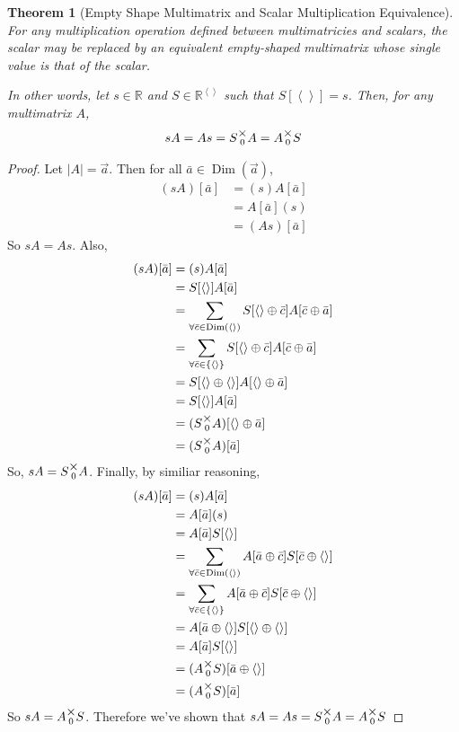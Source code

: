 \documentclass[12pt]{book}
\theoremstyle{plain}
\newtheorem{theorem}{Theorem}[chapter]
\theoremstyle{definition}
\theoremstyle{ppart}
\theoremstyle{case}
\theoremstyle{solution}
\DeclareMathOperator{\Dim}{Dim}
\newcommand{\mmult}[1]{\text{\raisebox{1ex}{$\underset{#1}{\times}$}}}
\begin{document}
\begin{theorem}[Empty Shape Multimatrix and Scalar Multiplication Equivalence]
\label{s_mm_mult_equiv}
For any multiplication operation defined between multimatricies and scalars,
the scalar may be replaced by an equivalent empty-shaped multimatrix whose
single value is that of the scalar.

In other words, let $s \in \mathbb{R}$ and $S \in \mathbb{R}^{\left<\right>}$ such that
$S[\left<\right>] = s$. Then, for any multimatrix $A$, 
\[ sA = As = S \mmult{0} A = A \mmult{0} S \]
\end{theorem}
\begin{proof}
Let $|A| = \vec{a}$. Then for all $\bar{a} \in \Dim(\vec{a})$,
\begin{align*}
	(sA)[\bar{a}]
	&= (s)A[\bar{a}] \\
	&= A[\bar{a}](s) \\
	&= (As)[\bar{a}]
\end{align*}
So $sA = As$. Also,
\begin{align*}
	(sA)[\bar{a}]
	&= (s)A[\bar{a}] \\
	&= S[\left<\right>]A[\bar{a}] \\
	&= \sum_{\forall \bar{c} \in \Dim(\left<\right>)}
		S[\left<\right> \oplus \bar{c}]A[\bar{c} \oplus \bar{a}] \\
	&= \sum_{\forall \bar{c} \in \{\left<\right>\}}
		S[\left<\right> \oplus \bar{c}]A[\bar{c} \oplus \bar{a}] \\
	&= S[\left<\right> \oplus \left<\right>]A[\left<\right> \oplus \bar{a}] \\
	&= S[\left<\right>]A[\bar{a}] \\
	&= (S \mmult{0} A)[\left<\right> \oplus \bar{a}] \\
	&= (S \mmult{0} A)[\bar{a}] \\
\end{align*}
So, $sA = S \mmult{0} A$.
Finally, by similiar reasoning,
\begin{align*}
	(sA)[\bar{a}]
	&= (s)A[\bar{a}] \\
	&= A[\bar{a}](s) \\
	&= A[\bar{a}]S[\left<\right>] \\
	&= \sum_{\forall \bar{c} \in \Dim(\left<\right>)}
		A[\bar{a} \oplus \bar{c}] S[\bar{c} \oplus \left<\right>] \\
	&= \sum_{\forall \bar{c} \in \{\left<\right>\}}
		A[\bar{a} \oplus \bar{c}] S[\bar{c} \oplus \left<\right>] \\
	&= A[\bar{a} \oplus \left<\right>] S[\left<\right> \oplus \left<\right>] \\
	&= A[\bar{a}]S[\left<\right>] \\
	&= (A \mmult{0} S)[\bar{a} \oplus \left<\right>] \\
	&= (A \mmult{0} S)[\bar{a}]
\end{align*}
So $sA = A \mmult{0} S$. Therefore we've shown that
$sA = As = S \mmult{0} A = A \mmult{0} S$
\end{proof}
\end{document}

